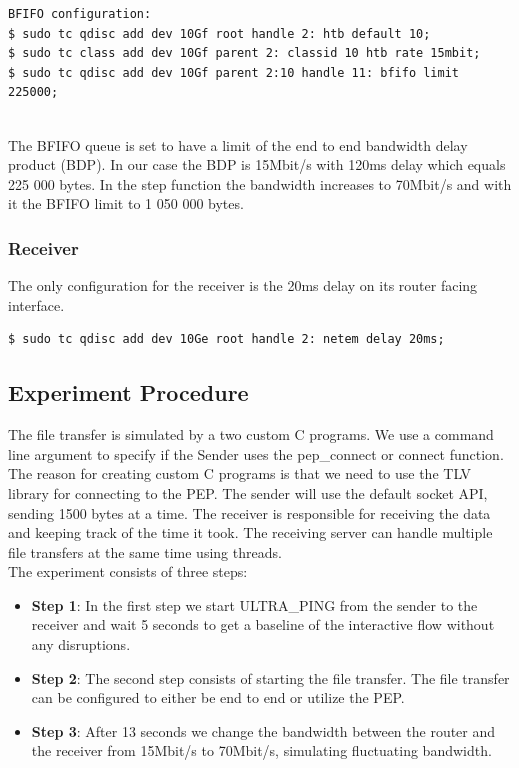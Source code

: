 \documentclass[a4paper,english, 11pt]{report}
\begin{document}
\begin{verbatim}
BFIFO configuration:
$ sudo tc qdisc add dev 10Gf root handle 2: htb default 10;
$ sudo tc class add dev 10Gf parent 2: classid 10 htb rate 15mbit;
$ sudo tc qdisc add dev 10Gf parent 2:10 handle 11: bfifo limit 225000;
\end{verbatim}\\

The BFIFO queue is set to have a limit of the end to end bandwidth delay product (BDP).
In our case the BDP is 15Mbit/s with 120ms delay which equals 225 000 bytes. In the step function the bandwidth increases to 70Mbit/s and with it the BFIFO limit to 1 050 000 bytes.

\subsubsection{Receiver}
The only configuration for the receiver is the 20ms delay on its router facing interface.
\begin{verbatim}
$ sudo tc qdisc add dev 10Ge root handle 2: netem delay 20ms;
\end{verbatim}


\subsection{Experiment Procedure}
The file transfer is simulated by a two custom C programs. We use a command line argument to specify if the Sender uses the pep\_connect or connect function. The reason for creating custom C programs is that we need to use the TLV library for connecting to the PEP. The sender will use the default socket API, sending 1500 bytes at a time. The receiver is responsible for receiving the data and keeping track of the time it took. The receiving server can handle multiple file transfers at the same time using threads.\\

The experiment consists of three steps:

\begin{itemize}
  \item \textbf{Step 1}: In the first step we start ULTRA\_PING from the sender to the receiver and wait 5 seconds to get a baseline of the interactive flow without any disruptions.
  \item \textbf{Step 2}: The second step consists of starting the file transfer. The file transfer can be configured to either be end to end or utilize the PEP.
  \item \textbf{Step 3}: After 13 seconds we change the bandwidth between the router and the receiver from 15Mbit/s to 70Mbit/s, simulating fluctuating bandwidth.
\end{itemize}
\end{document}
